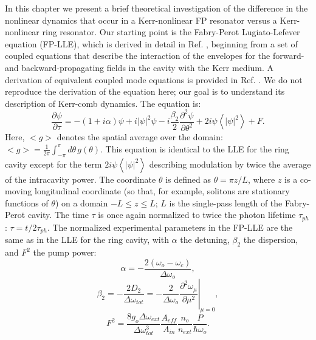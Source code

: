 In this chapter we present a brief theoretical investigation of the difference in the nonlinear dynamics that occur in a Kerr-nonlinear FP resonator versus a Kerr-nonlinear ring resonator. Our starting point is the Fabry-Perot Lugiato-Lefever equation (FP-LLE), which is derived in detail in Ref. , beginning from a set of coupled equations that describe the interaction of the envelopes for the forward- and backward-propagating fields in the cavity with the Kerr medium. A derivation of equivalent coupled mode equations is provided in Ref. . We do not reproduce the derivation of the equation here; our goal is to understand its description of Kerr-comb dynamics. The equation is:
\begin{equation}
\frac{\partial\psi}{\partial\tau}=-(1+i\alpha)\psi+i|\psi|^2\psi-i\frac{\beta_2}{2}\frac{\partial^2\psi}{\partial\theta^2}+2i\psi\left<|\psi|^2\right>+F\label{eq:FPLLE}.
\end{equation}
Here, $<g>$ denotes the spatial average over the domain: $<g>=\frac{1}{2\pi}\int_{-\pi}^{\pi}d\theta\,g(\theta)$. This equation is identical to the LLE for the ring cavity except for the term $2i\psi\left<|\psi|^2\right>$ describing modulation by twice the average of the intracavity power. The coordinate $\theta$ is defined as $\theta=\pi z/L$, where $z$ is a co-moving longitudinal coordinate (so that, for example, solitons are stationary functions of $\theta$) on a domain $-L\leq z\leq L$; $L$ is the single-pass length of the Fabry-Perot cavity. The time $\tau$ is once again normalized to twice the photon lifetime $\tau_{ph}$: $\tau=t/2\tau_{ph}$. The normalized experimental parameters in the FP-LLE are the same as in the LLE for the ring cavity, with $\alpha$ the detuning, $\beta_2$ the dispersion, and $F^2$ the pump power:
\begin{equation}
\alpha=-\frac{2(\omega_o-\omega_c)}{\Delta\omega_o},
\end{equation}
\begin{equation}
\beta_2=\left.-\frac{2D_2}{\Delta\omega_{tot}}=-\frac{2}{\Delta\omega_o}\frac{\partial^2\omega_\mu}{\partial \mu^2}\right|_{\mu=0}, \label{betaLLE}
\end{equation}
\begin{equation}
F^2=\frac{8g_o\Delta\omega_{ext}}{\Delta\omega_{tot}^3}\frac{A_{eff}}{A_{in}}\frac{n_o}{n_{ext}}\frac{P}{\hbar\omega_o}.
\end{equation}
